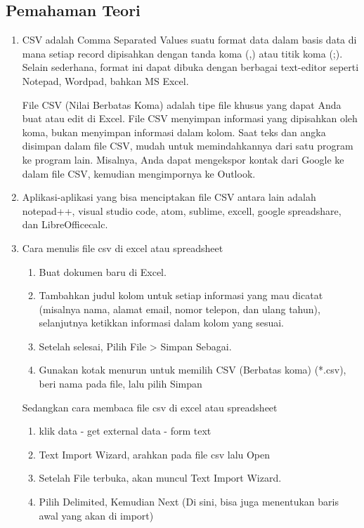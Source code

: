 \subsection{Pemahaman Teori}
\begin{enumerate}
    \item CSV adalah Comma Separated Values suatu format data dalam basis data di mana setiap record dipisahkan dengan tanda koma (,) atau titik koma (;). Selain sederhana, format ini dapat dibuka dengan berbagai text-editor seperti Notepad, Wordpad, bahkan MS Excel.
    \par File CSV (Nilai Berbatas Koma) adalah tipe file khusus yang dapat Anda buat atau edit di Excel. File CSV menyimpan informasi yang dipisahkan oleh koma, bukan menyimpan informasi dalam kolom. Saat teks dan angka disimpan dalam file CSV, mudah untuk memindahkannya dari satu program ke program lain. Misalnya, Anda dapat mengekspor kontak dari Google ke dalam file CSV, kemudian mengimpornya ke Outlook.
    \item Aplikasi-aplikasi yang bisa menciptakan file CSV antara lain adalah notepad++, visual studio code, atom, sublime, excell, google spreadshare, dan LibreOfficecalc.
    \item Cara menulis file csv di excel atau spreadsheet
    \begin{enumerate}
        \item Buat dokumen baru di Excel.
        \item Tambahkan judul kolom untuk setiap informasi yang mau dicatat (misalnya nama, alamat email, nomor telepon, dan ulang tahun), selanjutnya ketikkan informasi dalam kolom yang sesuai.
        \item Setelah selesai, Pilih File > Simpan Sebagai.
        \item Gunakan kotak menurun untuk memilih CSV (Berbatas koma) (*.csv), beri nama pada file, lalu pilih Simpan
    \end{enumerate}
    \par Sedangkan cara membaca file csv di excel atau spreadsheet
    \begin{enumerate}
        \item klik data - get external data - form text
        \item Text Import Wizard, arahkan pada file csv lalu Open
        \item Setelah File terbuka, akan muncul Text Import Wizard.
        \item Pilih Delimited, Kemudian Next (Di sini, bisa juga menentukan baris awal yang akan di import)

\end{enumerate}
\end{enumerate}
